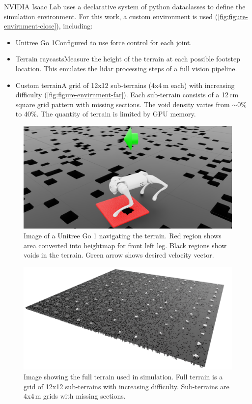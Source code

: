 NVIDIA Isaac Lab uses a declarative system of python dataclasses to
define the simulation environment. For this work, a custom
environment is used (\autoref{fig:figure-envirnment-close}), including:

\begin{itemize}
  \item Unitree Go 1\textemdash Configured to use force control for each joint.
  \item Terrain raycasts\textemdash Measure the height of the terrain
    at each possible footstep location. This emulates the lidar
    processing steps of a full vision pipeline.
  \item Custom terrain\textemdash A grid of 12x12 sub-terrains
    (4x4\,m each) with increasing difficulty
    (\autoref{fig:figure-envirnment-far}). Each sub-terrain consists
    of     a 12\,cm square grid pattern with missing sections. The
    void density     varies from $\sim$0\% to 40\%. The quantity of
    terrain is limited     by GPU memory.
\end{itemize}

\begin{figure}[H]
  \centering
  \includegraphics[width=0.75\linewidth]{images/figures/environment-close.png}
  \caption{Image of a Unitree Go 1 navigating the terrain. Red
    region shows area converted into heightmap for front left leg.
    Black regions show voids   in the terrain. Green arrow shows
  desired velocity vector.}
  \label{fig:figure-envirnment-close}
\end{figure}

\begin{figure}[H]
  \centering
  \includegraphics[width=0.75\linewidth]{images/figures/environment-far.png}
  \caption{Image showing the full terrain used in simulation.
    Full terrain is a grid of 12x12 sub-terrains with increasing
  difficulty.     Sub-terrains are 4x4\,m grids with missing sections.}
  \label{fig:figure-envirnment-far}
\end{figure}
